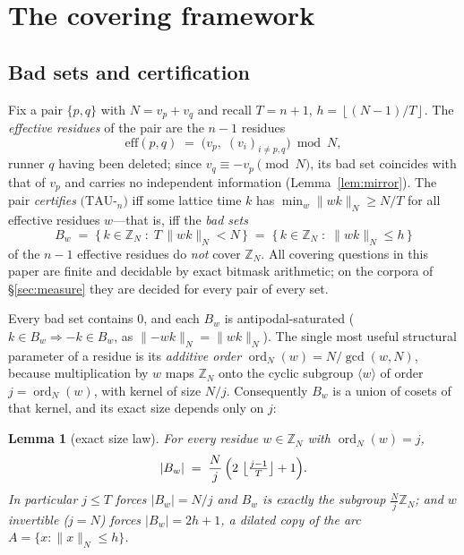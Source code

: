 \documentclass[11pt,a4paper]{article}
\numberwithin{equation}{section}
\theoremstyle{plain}
\theoremstyle{plain}
\newtheorem{lemma}[theorem]{Lemma}
\theoremstyle{definition}
\theoremstyle{remark}
\newcommand{\Z}{\mathbb{Z}}
\newcommand{\floor}[1]{\left\lfloor #1 \right\rfloor}
\newcommand{\wn}[1]{\lVert #1 \rVert_{N}}
\DeclareMathOperator{\ord}{ord}
\begin{document}

\section{The covering framework}\label{sec:covering}

\subsection{Bad sets and certification}

Fix a pair $\{p,q\}$ with $N=v_p+v_q$ and recall
$T=n+1$, $h=\floor{(N-1)/T}$. The \emph{effective residues} of the pair are
the $n-1$ residues
\[
\mathrm{eff}(p,q)\;=\;\bigl(v_p,\; (v_i)_{i\ne p,q}\bigr)\bmod N ,
\]
runner $q$ having been deleted; since $v_q\equiv -v_p\pmod N$, its bad set
coincides with that of $v_p$ and carries no independent information
(Lemma~\ref{lem:mirror}). The pair \emph{certifies} $(\mathrm{TAU}$-$_n)$
iff some lattice time $k$ has
$\min_w \wn{wk}\ge N/T$ for all effective residues $w$---that is, iff the
\emph{bad sets}
\[
B_w\;=\;\{\,k\in\Z_N \;:\; T\,\wn{wk}<N\,\}
     \;=\;\{\,k\in\Z_N \;:\; \wn{wk}\le h\,\}
\]
of the $n-1$ effective residues do \emph{not} cover $\Z_N$. All covering
questions in this paper are finite and decidable by exact bitmask
arithmetic; on the corpora of \S\ref{sec:measure} they are decided for
every pair of every set.

Every bad set contains $0$, and each $B_w$ is antipodal-saturated
($k\in B_w\Rightarrow -k\in B_w$, as $\wn{-wk}=\wn{wk}$). The single most
useful structural parameter of a residue is its \emph{additive order}
$\ord_N(w)=N/\gcd(w,N)$, because multiplication by $w$ maps $\Z_N$ onto
the cyclic subgroup $\langle w\rangle$ of order $j=\ord_N(w)$, with kernel
of size $N/j$. Consequently $B_w$ is a union of cosets of that kernel, and
its exact size depends only on $j$:

\begin{lemma}[exact size law]\label{lem:size}
For every residue $w\in\Z_N$ with $\ord_N(w)=j$,
\[
|B_w|\;=\;\frac{N}{j}\,\Bigl(2\,\floor{\tfrac{j-1}{T}}+1\Bigr).
\]
In particular $j\le T$ forces $|B_w|=N/j$ and $B_w$ is \emph{exactly} the
subgroup $\tfrac{N}{j}\Z_N$; and $w$ invertible ($j=N$) forces
$|B_w|=2h+1$, a dilated copy of the arc $A=\{x:\wn{x}\le h\}$.
\end{lemma}
\end{document}
